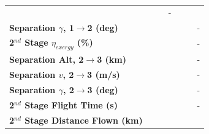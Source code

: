 \begin{table}[ht]
\begin{tabular}{l c c c c c c}
			& \firstsecondSeparationvCdThreeOneOneHundredFiveNoReturn
			& \firstsecondSeparationvCdThreeOneHundredTenNoReturn
			& -
			\\
			\textbf{Separation $\gamma$, 1$\rightarrow$2 (deg)}
			& \firstsecondSeparationgammaCdThreeNinetyNoReturn
			& \firstsecondSeparationgammaCdThreeNinetyFiveNoReturn
			& \firstsecondSeparationgammaCdThreeStandardNoReturn
			& \firstsecondSeparationgammaCdThreeOneOneHundredFiveNoReturn
			& \firstsecondSeparationgammaCdThreeOneHundredTenNoReturn
			& -
			\\
			\hline 
			\textbf{2$^{nd}$ Stage $\eta_{exergy}$ (\%)}
			& \textbf{\secondExergyEffCdThreeNinetyNoReturn}
			& \textbf{\secondExergyEffCdThreeNinetyFiveNoReturn}
			& \textbf{\secondExergyEffCdThreeStandardNoReturn}
			& \textbf{\secondExergyEffCdThreeOneOneHundredFiveNoReturn}
			& \textbf{\secondExergyEffCdThreeOneHundredTenNoReturn}
			& -
			\\
			\textbf{Separation Alt, 2$\rightarrow$3 (km)}
			& \secondthirdSeparationAltCdThreeNinetyNoReturn
			& \secondthirdSeparationAltCdThreeNinetyFiveNoReturn
			& \secondthirdSeparationAltCdThreeStandardNoReturn
			& \secondthirdSeparationAltCdThreeOneOneHundredFiveNoReturn
			& \secondthirdSeparationAltCdThreeOneHundredTenNoReturn
			& -
			\\
			\textbf{Separation $v$, 2$\rightarrow$3 (m/s)}
			& \secondthirdSeparationvCdThreeNinetyNoReturn
			& \secondthirdSeparationvCdThreeNinetyFiveNoReturn
			& \secondthirdSeparationvCdThreeStandardNoReturn
			& \secondthirdSeparationvCdThreeOneOneHundredFiveNoReturn
			& \secondthirdSeparationvCdThreeOneHundredTenNoReturn
			& -
			\\
			\textbf{Separation $\gamma$, 2$\rightarrow$3 (deg)}
			& \secondthirdSeparationgammaCdThreeNinetyNoReturn
			& \secondthirdSeparationgammaCdThreeNinetyFiveNoReturn
			& \secondthirdSeparationgammaCdThreeStandardNoReturn
			& \secondthirdSeparationgammaCdThreeOneOneHundredFiveNoReturn
			& \secondthirdSeparationgammaCdThreeOneHundredTenNoReturn
			& -
			\\
			\textbf{2$^{nd}$ Stage Flight Time (s)}
			& \secondFlightTimeCdThreeNinetyNoReturn
			& \secondFlightTimeCdThreeNinetyFiveNoReturn
			& \secondFlightTimeCdThreeStandardNoReturn
			& \secondFlightTimeCdThreeOneOneHundredFiveNoReturn
			& \secondFlightTimeCdThreeOneHundredTenNoReturn
			& -
			\\
			\textbf{2$^{nd}$ Stage Distance Flown (km)}
			& \SecondDistCdThreeNinetyNoReturn
			& \SecondDistCdThreeNinetyFiveNoReturn

\end{tabular}
\end{table}
